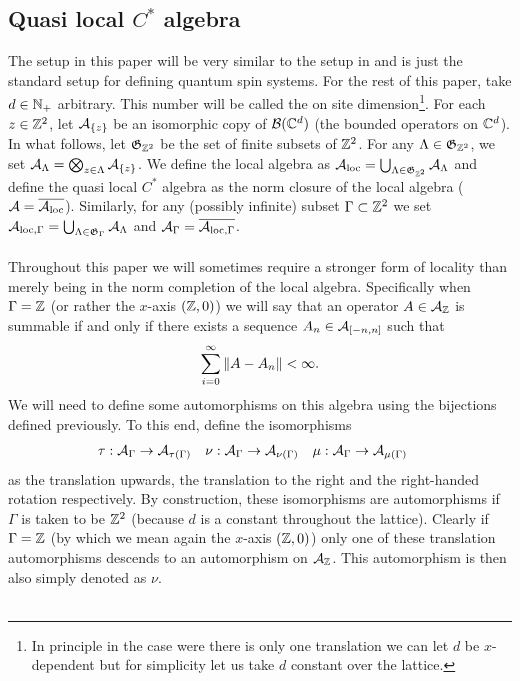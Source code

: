 \documentclass[12pt,a4paper,twoside]{article}
\numberwithin{equation}{section}
\begin{document}
\subsection{Quasi local $C^*$ algebra}\label{sec:QuasiLocalC*Algebra}
The setup in this paper will be very similar to the setup in \cite{ogata2021h3gmathbb} and is just the standard setup for defining quantum spin systems. For the rest of this paper, take $d\in\NN_+$ arbitrary. This number will be called the on site dimension\footnote{In principle in the case were there is only one translation we can let $d$ be $x$-dependent but for simplicity let us take $d$ constant over the lattice.}. For each $z\in\ZZ^2$, let $\AA_{\{z\}}$ be an isomorphic copy of $\BB(\CC^d)$ (the bounded operators on $\CC^d$). In what follows, let $\mathfrak{G}_{\ZZ^2}$ be the set of finite subsets of $\ZZ^2$. For any $\Lambda\in\mathfrak{G}_{\ZZ^2}$, we set $\AA_\Lambda=\bigotimes_{z\in\Lambda}\AA_{\{z\}}$. We define the local algebra as $\AA_{\text{loc}}=\bigcup_{\Lambda\in \mathfrak{G}_{\ZZ^2}}\AA_{\Lambda}$ and define the quasi local $C^*$ algebra as the norm closure of the local algebra ($\AA=\overline{\AA_{\text{loc}}}$). Similarly, for any (possibly infinite) subset $\Gamma\subset\ZZ^2$ we set $\AA_{\text{loc},\Gamma}=\bigcup_{\Lambda\in \mathfrak{G}_{\Gamma}}\AA_{\Lambda}$ and $\AA_\Gamma=\overline{\AA_{\text{loc},\Gamma}}$.\\\\
Throughout this paper we will sometimes require a stronger form of locality than merely being in the norm completion of the local algebra. Specifically when $\Gamma=\ZZ$ (or rather the $x$-axis $(\ZZ,0)$) we will say that an operator $A\in\AA_{\ZZ}$ is summable if and only if there exists a sequence $A_n\in\AA_{[-n,n]}$ such that
\begin{equation}
	\sum_{i=0}^{\infty}\norm{A-A_n}<\infty.
\end{equation}
We will need to define some automorphisms on this algebra using the bijections defined previously. To this end, define the isomorphisms
\begin{align}
\tau&:\AA_\Gamma\rightarrow\AA_{\tau(\Gamma)}&\nu&:\AA_\Gamma\rightarrow\AA_{\nu(\Gamma)}&\mu&:\AA_\Gamma\rightarrow\AA_{\mu(\Gamma)}
\end{align}
as the translation upwards, the translation to the right and the right-handed rotation respectively. By construction, these isomorphisms are automorphisms if $\Gamma$ is taken to be $\ZZ^2$ (because $d$ is a constant throughout the lattice). Clearly if $\Gamma=\ZZ$ (by which we mean again the $x$-axis $(\ZZ,0)$) only one of these translation automorphisms descends to an automorphism on $\AA_{\ZZ}$. This automorphism is then also simply denoted as $\nu$.\\\\
\end{document}
